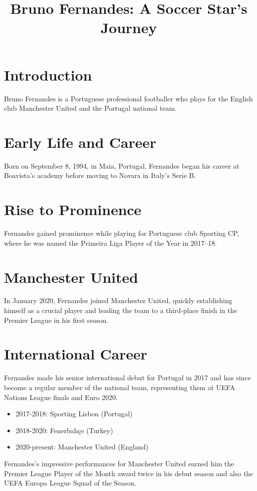\documentclass{article}
\title{Bruno Fernandes: A Soccer Star's Journey}
\author{}
\date{}
\begin{document}
\maketitle

\section*{Introduction}
Bruno Fernandes is a Portuguese professional footballer who plays for the English club Manchester United and the Portugal national team.

\section*{Early Life and Career}
Born on September 8, 1994, in Maia, Portugal, Fernandes began his career at Boavista's academy before moving to Novara in Italy's Serie B.

\section*{Rise to Prominence}
Fernandes gained prominence while playing for Portuguese club Sporting CP, where he was named the Primeira Liga Player of the Year in 2017–18.

\section*{Manchester United}
In January 2020, Fernandes joined Manchester United, quickly establishing himself as a crucial player and leading the team to a third-place finish in the Premier League in his first season.

\section*{International Career}
Fernandes made his senior international debut for Portugal in 2017 and has since become a regular member of the national team, representing them at UEFA Nations League finals and Euro 2020.

\begin{itemize}
  \item 2017-2018: Sporting Lisbon (Portugal)
  \item 2018-2020: Fenerbahçe (Turkey)
  \item 2020-present: Manchester United (England)
\end{itemize}

Fernandes's impressive performances for Manchester United earned him the Premier League Player of the Month award twice in his debut season and also the UEFA Europa League Squad of the Season.
\end{document}
